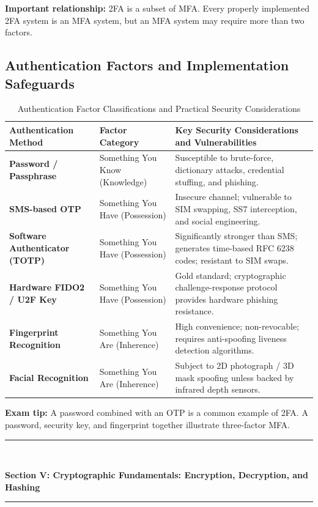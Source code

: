 \textbf{Important relationship:} 2FA is a subset of MFA. Every properly implemented 2FA system is an MFA system, but an MFA system may require more than two factors.

\subsection{Authentication Factors and Implementation Safeguards}

\begin{table}[htbp]
\centering
\caption{Authentication Factor Classifications and Practical Security Considerations}
\label{tab:auth_methods_security}
\begin{tabularx}{\textwidth}{p{3.8cm} p{3.2cm} X}
\toprule
\textbf{Authentication Method} & \textbf{Factor Category} & \textbf{Key Security Considerations and Vulnerabilities} \\
\midrule
\textbf{Password / Passphrase} & Something You Know (Knowledge) & Susceptible to brute-force, dictionary attacks, credential stuffing, and phishing. \\
\textbf{SMS-based OTP} & Something You Have (Possession) & Insecure channel; vulnerable to SIM swapping, SS7 interception, and social engineering. \\
\textbf{Software Authenticator (TOTP)} & Something You Have (Possession) & Significantly stronger than SMS; generates time-based RFC 6238 codes; resistant to SIM swaps. \\
\textbf{Hardware FIDO2 / U2F Key} & Something You Have (Possession) & Gold standard; cryptographic challenge-response protocol provides hardware phishing resistance. \\
\textbf{Fingerprint Recognition} & Something You Are (Inherence) & High convenience; non-revocable; requires anti-spoofing liveness detection algorithms. \\
\textbf{Facial Recognition} & Something You Are (Inherence) & Subject to 2D photograph / 3D mask spoofing unless backed by infrared depth sensors. \\
\bottomrule
\end{tabularx}
\end{table}


\textbf{Exam tip:} A password combined with an OTP is a common example of 2FA. A password, security key, and fingerprint together illustrate three-factor MFA.


\newpage
\begin{center}
\vspace{0.5em}
{\color{primary}\rule{0.45\textwidth}{1.2pt}\\[4pt]}
{\Large\bfseries\color{primary} Section V: Cryptographic Fundamentals: Encryption, Decryption, and Hashing\\[2pt]}
{\color{primary}\rule{0.45\textwidth}{1.2pt}}
\vspace{0.5em}
\end{center}

